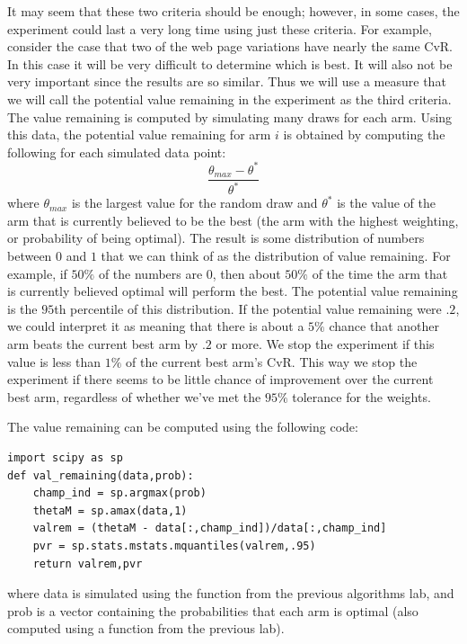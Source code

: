 It may seem that these two criteria should be enough; however, in some cases, the 
experiment could last a very long time using just these criteria.  
For example, consider the case that two of the web page variations have nearly the same CvR. 
In this case it will be very difficult to determine which is best.  
It will also not be very important since the results are so similar.  
Thus we will use a measure that we will call the potential value remaining 
in the experiment as the third criteria.  The value remaining is computed by 
simulating many draws for each arm.  Using this data, the potential value remaining 
for arm $i$ is obtained by computing the following for each simulated data point:
\begin{equation}\label{valrem}
\frac{\theta_{max} - \theta^*}{\theta^*}
\end{equation}
where $\theta_{max}$ is the largest value for the random draw and $\theta^*$ is the 
value of the arm that is currently believed to be the best 
(the arm with the highest weighting, or probability of being optimal).  
The result is some distribution of numbers between $0$ and $1$ that we can think 
of as the distribution of value remaining.  For example, if $50\%$ of the numbers are 0, 
then about $50\%$ of the time the arm that is currently believed optimal will perform the best.  
The potential value remaining is the $95$th percentile of this distribution.  
If the potential value remaining were $.2$, we could interpret it as meaning 
that there is about a $5\%$ chance that another arm beats the current best arm by $.2$ or more.
We stop the experiment if this value is less than $1\%$ of the current best arm's CvR.
This way we stop the experiment if there seems to be little chance of improvement over 
the current best arm, regardless of whether we've met the $95\%$ tolerance for the weights.

The value remaining can be computed using the following code:
\begin{lstlisting}
import scipy as sp
def val_remaining(data,prob):
    champ_ind = sp.argmax(prob)
    thetaM = sp.amax(data,1)
    valrem = (thetaM - data[:,champ_ind])/data[:,champ_ind]
    pvr = sp.stats.mstats.mquantiles(valrem,.95)
    return valrem,pvr
\end{lstlisting}
where data is simulated using the  function from the previous algorithms lab, 
and prob is a vector containing the probabilities that each arm is optimal
(also computed using a function from the previous lab).

